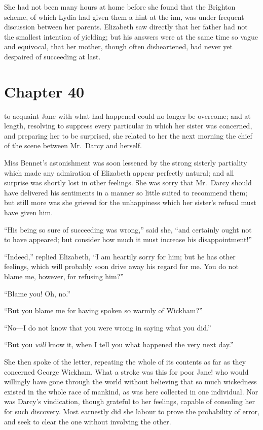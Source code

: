 She had not been many hours at home before she found that the
Brighton scheme, of which Lydia had given them a hint at the inn,
was under frequent discussion between her parents.  Elizabeth
saw directly that her father had not the smallest intention of
yielding; but his answers were at the same time so vague and
equivocal, that her mother, though often disheartened, had never
yet despaired of succeeding at last.



\chapter{Chapter 40}


 to acquaint Jane with what had happened
could no longer be overcome; and at length, resolving to
suppress every particular in which her sister was concerned,
and preparing her to be surprised, she related to her the next
morning the chief of the scene between Mr.\ Darcy and herself.

Miss Bennet's astonishment was soon lessened by the strong
sisterly partiality which made any admiration of Elizabeth appear
perfectly natural; and all surprise was shortly lost in other
feelings.  She was sorry that Mr.\ Darcy should have delivered his
sentiments in a manner so little suited to recommend them; but
still more was she grieved for the unhappiness which her sister's
refusal must have given him.

``His being so sure of succeeding was wrong,'' said she, ``and
certainly ought not to have appeared; but consider how much it
must increase his disappointment!''

``Indeed,'' replied Elizabeth, ``I am heartily sorry for him; but he
has other feelings, which will probably soon drive away his
regard for me.  You do not blame me, however, for refusing him?''

``Blame you!  Oh, no.''

``But you blame me for having spoken so warmly of Wickham?''

``No---I do not know that you were wrong in saying what you
did.''

``But you \emph{will} know it, when I tell you what happened the very
next day.''

She then spoke of the letter, repeating the whole of its contents
as far as they concerned George Wickham.  What a stroke was
this for poor Jane! who would willingly have gone through the
world without believing that so much wickedness existed in the
whole race of mankind, as was here collected in one individual.
Nor was Darcy's vindication, though grateful to her feelings,
capable of consoling her for such discovery.  Most earnestly did
she labour to prove the probability of error, and seek to clear the
one without involving the other.

